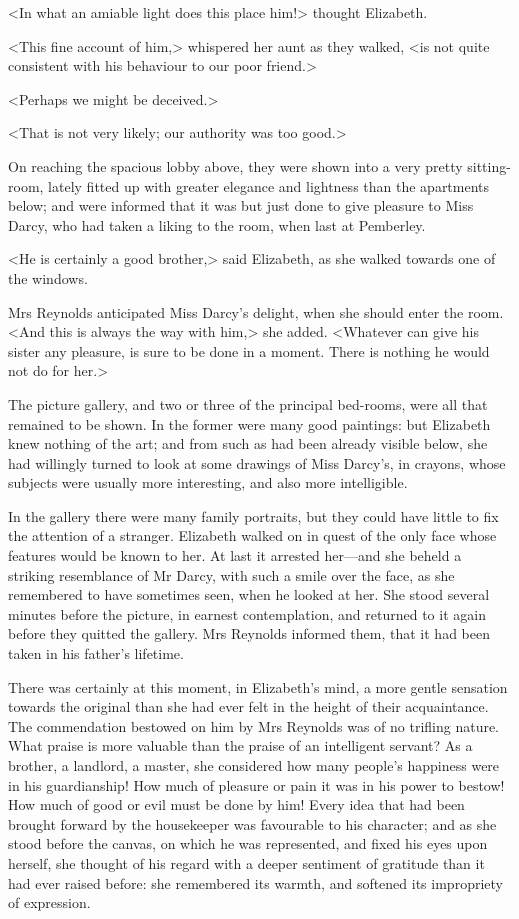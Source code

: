 <In what an amiable light does this place him!> thought Elizabeth.

<This fine account of him,> whispered her aunt as they walked, <is not quite consistent with his behaviour to our poor friend.>

<Perhaps we might be deceived.>

<That is not very likely; our authority was too good.>

On reaching the spacious lobby above, they were shown into a very pretty sitting-room, lately fitted up with greater elegance and lightness than the apartments below; and were informed that it was but just done to give pleasure to Miss Darcy, who had taken a liking to the room, when last at Pemberley.

<He is certainly a good brother,> said Elizabeth, as she walked towards one of the windows.

Mrs Reynolds anticipated Miss Darcy's delight, when she should enter the room. <And this is always the way with him,> she added. <Whatever can give his sister any pleasure, is sure to be done in a moment. There is nothing he would not do for her.>

The picture gallery, and two or three of the principal bed-rooms, were all that remained to be shown. In the former were many good paintings: but Elizabeth knew nothing of the art; and from such as had been already visible below, she had willingly turned to look at some drawings of Miss Darcy's, in crayons, whose subjects were usually more interesting, and also more intelligible.

In the gallery there were many family portraits, but they could have little to fix the attention of a stranger. Elizabeth walked on in quest of the only face whose features would be known to her. At last it arrested her—and she beheld a striking resemblance of Mr Darcy, with such a smile over the face, as she remembered to have sometimes seen, when he looked at her. She stood several minutes before the picture, in earnest contemplation, and returned to it again before they quitted the gallery. Mrs Reynolds informed them, that it had been taken in his father's lifetime.

There was certainly at this moment, in Elizabeth's mind, a more gentle sensation towards the original than she had ever felt in the height of their acquaintance. The commendation bestowed on him by Mrs Reynolds was of no trifling nature. What praise is more valuable than the praise of an intelligent servant? As a brother, a landlord, a master, she considered how many people's happiness were in his guardianship! How much of pleasure or pain it was in his power to bestow! How much of good or evil must be done by him! Every idea that had been brought forward by the housekeeper was favourable to his character; and as she stood before the canvas, on which he was represented, and fixed his eyes upon herself, she thought of his regard with a deeper sentiment of gratitude than it had ever raised before: she remembered its warmth, and softened its impropriety of expression.

